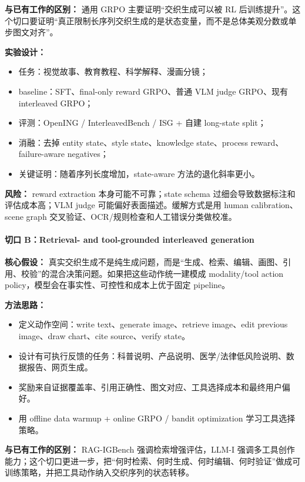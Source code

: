 \textbf{与已有工作的区别：} 通用 GRPO 主要证明“交织生成可以被 RL 后训练提升”。这个切口要证明“真正限制长序列交织生成的是状态变量，而不是总体美观分数或单步图文对齐”。

\textbf{实验设计：}

\begin{itemize}[leftmargin=1.5em]
  \item 任务：视觉故事、教育教程、科学解释、漫画分镜；
  \item baseline：SFT、final-only reward GRPO、普通 VLM judge GRPO、现有 interleaved GRPO；
  \item 评测：OpenING / InterleavedBench / ISG + 自建 long-state split；
  \item 消融：去掉 entity state、style state、knowledge state、process reward、failure-aware negatives；
  \item 关键证明：随着序列长度增加，state-aware 方法的退化斜率更小。
\end{itemize}

\textbf{风险：} reward extraction 本身可能不可靠；state schema 过细会导致数据标注和评估成本高；VLM judge 可能偏好表面描述。缓解方式是用 human calibration、scene graph 交叉验证、OCR/规则检查和人工错误分类做校准。

\paragraph{切口 B：Retrieval- and tool-grounded interleaved generation}

\textbf{核心假设：} 真实交织生成不是纯生成问题，而是“生成、检索、编辑、画图、引用、校验”的混合决策问题。如果把这些动作统一建模成 modality/tool action policy，模型会在事实性、可控性和成本上优于固定 pipeline。

\textbf{方法思路：}

\begin{itemize}[leftmargin=1.5em]
  \item 定义动作空间：write text、generate image、retrieve image、edit previous image、draw chart、cite source、verify state。
  \item 设计有可执行反馈的任务：科普说明、产品说明、医学/法律低风险说明、数据报告、网页生成。
  \item 奖励来自证据覆盖率、引用正确性、图文对应、工具选择成本和最终用户偏好。
  \item 用 offline data warmup + online GRPO / bandit optimization 学习工具选择策略。
\end{itemize}

\textbf{与已有工作的区别：} RAG-IGBench 强调检索增强评估，LLM-I 强调多工具创作能力；这个切口更进一步，把“何时检索、何时生成、何时编辑、何时验证”做成可训练策略，并把工具动作纳入交织序列的状态转移。

